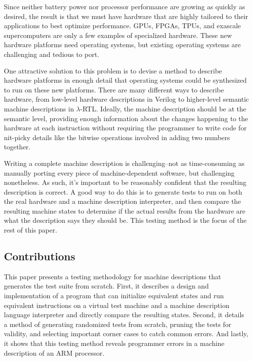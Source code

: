 \documentclass[letterpaper,12pt]{article}
\begin{document}
Since neither battery power nor processor performance are growing as quickly as desired, the result is that we must have hardware that are highly tailored to their applications to best optimize performance. GPUs, FPGAs, TPUs, and exascale supercomputers are only a few examples of specialized hardware. These new hardware platforms need operating systems, but existing operating systems are challenging and tedious to port.

One attractive solution to this problem is to devise a method to describe hardware platforms in enough detail that operating systems could be synthesized to run on these new platforms. There are many different ways to describe hardware, from low-level hardware descriptions in Verilog to higher-level semantic machine descriptions in $\lambda$-RTL. Ideally, the machine description should be at the semantic level, providing enough information about the changes happening to the hardware at each instruction without requiring the programmer to write code for nit-picky details like the bitwise operations involved in adding two numbers together.

Writing a complete machine description is challenging--not as time-consuming as manually porting every piece of machine-dependent software, but challenging nonetheless. As such, it's important to be reasonably confident that the resulting description is correct. A good way to do this is to generate tests to run on both the real hardware and a machine description interpreter, and then compare the resulting machine states to determine if the actual results from the hardware are what the description says they should be. This testing method is the focus of the rest of this paper.

\subsection{Contributions}

This paper presents a testing methodology for machine descriptions that generates the test suite from scratch. First, it describes a design and implementation of a program that can initialize equivalent states and run equivalent instructions on a virtual test machine and a machine description language interpreter and directly compare the resulting states. Second, it details a method of generating randomized tests from scratch, pruning the tests for validity, and selecting important corner cases to catch common errors. And lastly, it shows that this testing method reveals programmer errors in a machine description of an ARM processor.
\end{document}
